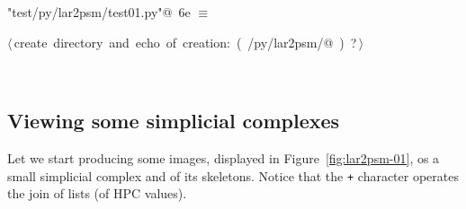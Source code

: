 \documentclass[11pt,oneside]{article}	%
\begin{document}
\begin{flushleft} \small
\begin{minipage}{\linewidth} \label{scrap18}
\protect{}\verb@"test/py/lar2psm/test01.py"@\nobreak\ {\footnotesize 6e }$\equiv$
\vspace{-1ex}
\begin{list}{}{} \item
\mbox{}\verb@@\hbox{$\langle\,$create directory and echo of creation:\nobreak\ ({\footnotesize {}\label{scrap19}
 }\mbox{}\verb@test/py/lar2psm/@ ) {\footnotesize ?}$\,\rangle$}\verb@@\\
\mbox{}\verb@@{\NWsep}
\end{list}
\vspace{-2ex}
\end{minipage}\\[4ex]
\end{flushleft}


\subsection{Viewing some simplicial complexes}
Let we start producing some images, displayed in Figure~\ref{fig:lar2psm-01}, os a small simplicial complex and of its skeletons. Notice that the \texttt{+} character operates the join of lists (of HPC values).
\end{document}
